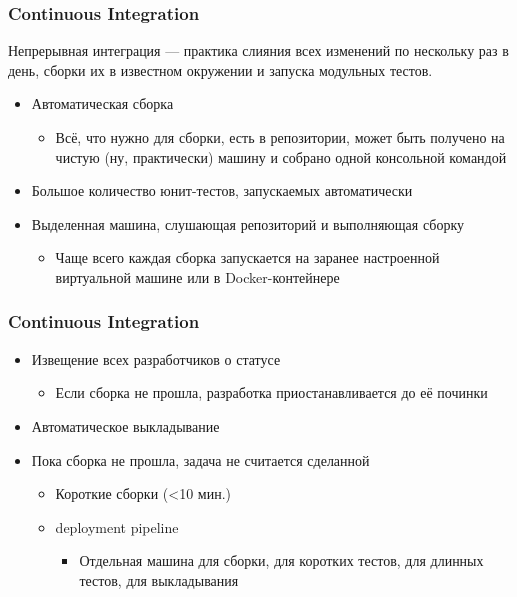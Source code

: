\documentclass{../../slides-style}
\begin{document}
    \begin{frame}
        \frametitle{Continuous Integration}
        Непрерывная интеграция --- практика слияния всех изменений по нескольку раз в день, сборки их в известном окружении и запуска модульных тестов.
        \begin{itemize}
            \item Автоматическая сборка
            \begin{itemize}
                \item Всё, что нужно для сборки, есть в репозитории, может быть получено на чистую (ну, практически) машину и собрано одной консольной командой
            \end{itemize}
            \item Большое количество юнит-тестов, запускаемых автоматически
            \item Выделенная машина, слушающая репозиторий и выполняющая сборку
            \begin{itemize}
                \item Чаще всего каждая сборка запускается на заранее настроенной виртуальной машине или в Docker-контейнере
            \end{itemize}
        \end{itemize}
    \end{frame}

    \begin{frame}
        \frametitle{Continuous Integration}
        \begin{itemize}
            \item Извещение всех разработчиков о статусе
            \begin{itemize}
                \item Если сборка не прошла, разработка приостанавливается до её починки
            \end{itemize}
            \item Автоматическое выкладывание
            \item Пока сборка не прошла, задача не считается сделанной
            \begin{itemize}
                \item Короткие сборки (<10 мин.)
                \item deployment pipeline
                \begin{itemize}
                    \item Отдельная машина для сборки, для коротких тестов, для длинных тестов, для выкладывания
                \end{itemize}
            \end{itemize}
        \end{itemize}
    \end{frame}
\end{document}
